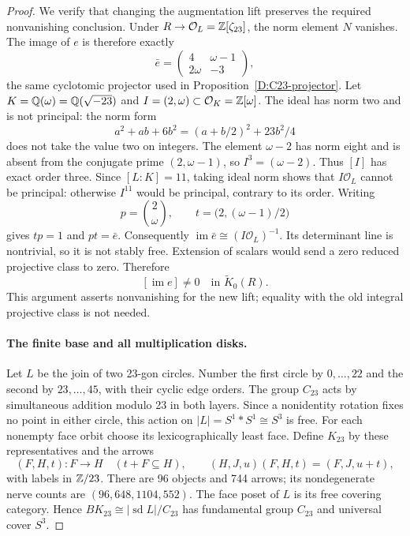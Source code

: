 \begin{proof}
We verify that changing the augmentation lift preserves the required
nonvanishing conclusion. Under $R\to\mathcal O_L=\mathbb Z[\zeta_{23}]$,
the norm element $N$ vanishes. The image of $e$ is therefore exactly
\[
 \bar e=\begin{pmatrix}4&\omega-1\\2\omega&-3\end{pmatrix},
\]
the same cyclotomic projector used in
Proposition~\ref{D:C23-projector}. Let
$K=\mathbb Q(\omega)=\mathbb Q(\sqrt{-23})$ and
$I=(2,\omega)\subset\mathcal O_K=\mathbb Z[\omega]$.
The ideal has norm two and is not principal: the norm form
\[
 a^2+ab+6b^2=(a+b/2)^2+23b^2/4
\]
does not take the value two on integers. The element $\omega-2$
has norm eight and is absent from the conjugate prime
$(2,\omega-1)$, so $I^3=(\omega-2)$. Thus $[I]$ has exact order
three. Since $[L:K]=11$, taking ideal norm shows that
$I\mathcal O_L$ cannot be principal: otherwise $I^{11}$ would
be principal, contrary to its order.
Writing
\[
 p=\binom{2}{\omega},\qquad
 t=\bigl(2,(\omega-1)/2\bigr)
\]
gives $tp=1$ and $pt=\bar e$. Consequently
$\operatorname{im}\bar e\cong(I\mathcal O_L)^{-1}$.
Its determinant line is nontrivial, so it is not stably free.
Extension of scalars would send a zero reduced projective class
to zero. Therefore
\[
 [\operatorname{im}e]\ne0\quad\text{in }\widetilde K_0(R).
\]
This argument asserts nonvanishing for the new lift; equality with
the old integral projective class is not needed.

\paragraph{The finite base and all multiplication disks.}
Let $L$ be the join of two 23-gon circles. Number the first circle
by $0,\ldots,22$ and the second by $23,\ldots,45$, with their
cyclic edge orders. The group $C_{23}$ acts by simultaneous
addition modulo 23 in both layers. Since a nonidentity rotation
fixes no point in either circle, this action on
$|L|=S^1*S^1\cong S^3$ is free. For each nonempty face orbit
choose its lexicographically least face. Define $K_{23}$ by these
representatives and the arrows
\[
 (F,H,t):F\longrightarrow H\quad(t+F\subseteq H),
 \qquad
 (H,J,u)(F,H,t)=(F,J,u+t),
\]
with labels in $\mathbb Z/23$. There are 96 objects and 744 arrows;
its nondegenerate nerve counts are $(96,648,1104,552)$.
The face poset of $L$ is its free covering category. Hence
$BK_{23}\cong|\operatorname{sd}L|/C_{23}$ has fundamental group
$C_{23}$ and universal cover $S^3$.


\end{proof}
